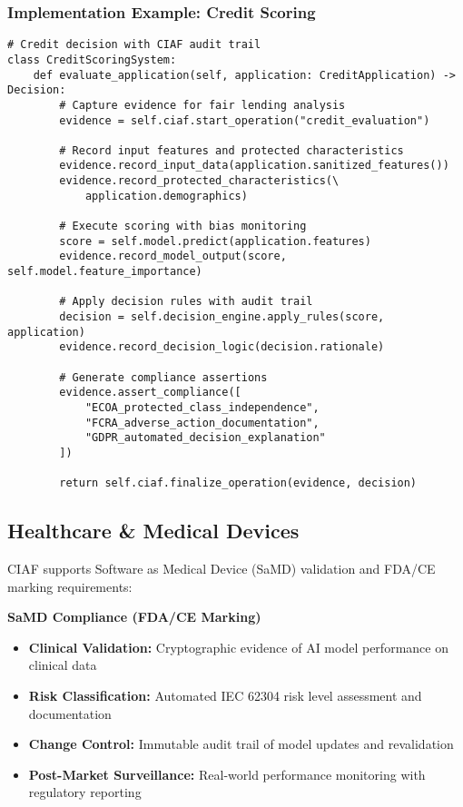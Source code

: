 \documentclass[12pt,a4paper]{article}
\begin{document}
\subsubsection{Implementation Example: Credit Scoring}

\begin{lstlisting}[caption=Banking Implementation Pattern]
# Credit decision with CIAF audit trail
class CreditScoringSystem:
    def evaluate_application(self, application: CreditApplication) -> Decision:
        # Capture evidence for fair lending analysis
        evidence = self.ciaf.start_operation("credit_evaluation")
        
        # Record input features and protected characteristics
        evidence.record_input_data(application.sanitized_features())
        evidence.record_protected_characteristics(\
            application.demographics)
        
        # Execute scoring with bias monitoring
        score = self.model.predict(application.features)
        evidence.record_model_output(score, self.model.feature_importance)
        
        # Apply decision rules with audit trail
        decision = self.decision_engine.apply_rules(score, application)
        evidence.record_decision_logic(decision.rationale)
        
        # Generate compliance assertions
        evidence.assert_compliance([
            "ECOA_protected_class_independence",
            "FCRA_adverse_action_documentation",
            "GDPR_automated_decision_explanation"
        ])
        
        return self.ciaf.finalize_operation(evidence, decision)
\end{lstlisting}

\subsection{Healthcare \& Medical Devices}

CIAF supports Software as Medical Device (SaMD) validation and FDA/CE marking requirements:

\begin{technicalbox}
\textbf{SaMD Compliance (FDA/CE Marking)}
\begin{itemize}
\item \textbf{Clinical Validation:} Cryptographic evidence of AI model performance on clinical data
\item \textbf{Risk Classification:} Automated IEC 62304 risk level assessment and documentation
\item \textbf{Change Control:} Immutable audit trail of model updates and revalidation
\item \textbf{Post-Market Surveillance:} Real-world performance monitoring with regulatory reporting
\end{itemize}
\end{technicalbox}
\end{document}
